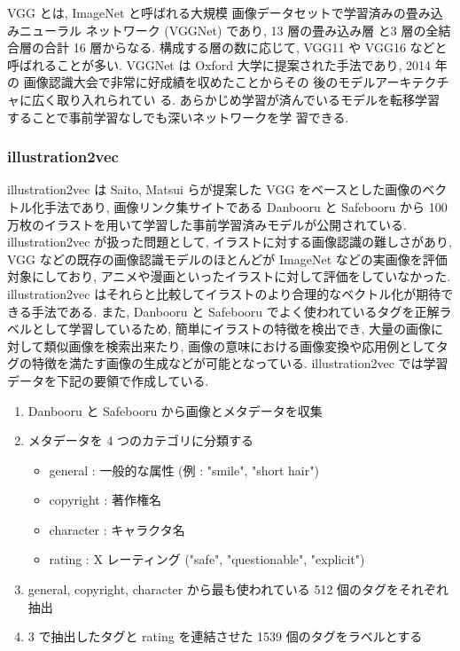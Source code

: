 VGG \cite{brusilovsky:simonyan2014very} とは, ImageNet と呼ばれる大規模
画像データセットで学習済みの畳み込みニューラル
ネットワーク (VGGNet) であり, 13 層の畳み込み層
と3 層の全結合層の合計 16 層からなる. 構成する層の数に応じて, VGG11 や VGG16 などと呼ばれることが多い. VGGNet は Oxford 大学に提案された手法であり, 2014 年の
画像認識大会で非常に好成績を収めたことからその
後のモデルアーキテクチャに広く取り入れられてい
る. あらかじめ学習が済んでいるモデルを転移学習
することで事前学習なしでも深いネットワークを学
習できる.

\changeindent{0cm}
\subsubsection{illustration2vec}
\changeindent{2cm}

illustration2vec \cite{i2v} は Saito, Matsui らが提案した VGG をベースとした画像のベクトル化手法であり, 画像リンク集サイトである Danbooru と Safebooru から 100 万枚のイラストを用いて学習した事前学習済みモデルが公開されている. illustration2vec が扱った問題として, イラストに対する画像認識の難しさがあり, VGG などの既存の画像認識モデルのほとんどが ImageNet などの実画像を評価対象にしており, アニメや漫画といったイラストに対して評価をしていなかった. illustration2vec はそれらと比較してイラストのより合理的なベクトル化が期待できる手法である. また, Danbooru と Safebooru でよく使われているタグを正解ラベルとして学習しているため, 簡単にイラストの特徴を検出でき, 大量の画像に対して類似画像を検索出来たり, 画像の意味における画像変換や応用例としてタグの特徴を満たす画像の生成などが可能となっている.
\newpage
illustration2vec では学習データを下記の要領で作成している.

\begin{enumerate}
  \item Danbooru と Safebooru から画像とメタデータを収集
  \item メタデータを 4 つのカテゴリに分類する
        \begin{itemize}
          \item general : 一般的な属性 (例 : "smile", "short hair")
          \item copyright : 著作権名
          \item character : キャラクタ名
          \item rating : X レーティング ("safe", "questionable", "explicit")
        \end{itemize}
  \item general, copyright, character から最も使われている 512 個のタグをそれぞれ抽出
  \item 3 で抽出したタグと rating を連結させた 1539 個のタグをラベルとする
\end{enumerate}
